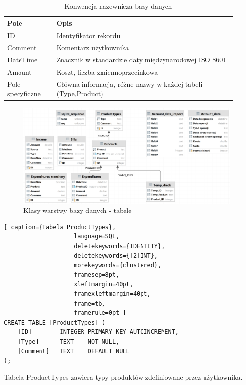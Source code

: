 \documentclass[a4paper,10pt, twoside]{report}
\newcommand{\customstyletable}[1]{\footnotesize{\textbf{#1}}}
\begin{document}
\begin{table}[h]
    \footnotesize
    \begin{tabular}{|p{0.2\linewidth}|p{0.73\linewidth}|}  %
    \hline                  %
    \customstyletable{Pole} & \customstyletable{Opis} \\
    \hline
    {ID} & {Identyfikator rekordu}\\
    \hline
    {Comment} & {Komentarz użytkownika}\\
    \hline
    {DateTime} & {Znacznik w standardzie daty międzynarodowej ISO 8601 \cite{ISO 8601}}\\
    \hline
    {Amount} & {Koszt, liczba zmiennoprzecinkowa}\\
    \hline
    {Pole specyficzne} & {Główna informacja, różne nazwy w każdej tabeli (Type,Product)}\\
    \hline
    \end{tabular}
    \caption{Konwencja nazewnicza bazy danych }
\end{table}

\begin{figure}[H]           %
    \caption{Klasy warstwy bazy danych - tabele}
    \label{fig:Klasy warstwy bazy danych - tabele}
    \centering  
    \includegraphics[width=12cm]{figures/Budgeter_Finances-db_Tables_DataGrid.png}
\end{figure}


\begin{minipage}{\textwidth}
\begin{lstlisting}[ caption={Tabela ProductTypes},
                    language=SQL,
                    deletekeywords={IDENTITY},
                    deletekeywords={[2]INT},
                    morekeywords={clustered},
                    framesep=8pt,
                    xleftmargin=40pt,
                    framexleftmargin=40pt,
                    frame=tb,
                    framerule=0pt ]
CREATE TABLE [ProductTypes] (
    [ID] 		INTEGER PRIMARY KEY AUTOINCREMENT,
    [Type] 		TEXT 	NOT NULL,
    [Comment] 	TEXT 	DEFAULT NULL
);
\end{lstlisting}
{Tabela ProductTypes zawiera typy produktów zdefiniowane przez użytkownika.}
\end{minipage}
\end{document}

